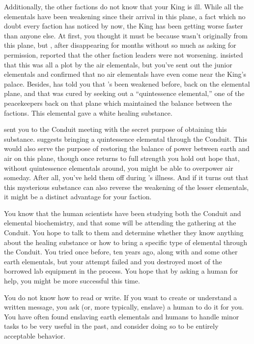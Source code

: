 \documentclass[char]{elementals}
\begin{document}
Additionally, the other factions do not know that your King is ill.  While all the elementals have been weakening since their arrival in this plane, a fact which no doubt every faction has noticed by now, the King has been getting worse faster than anyone else.  At first, you thought it must be because \cEarthKing{} wasn't originally from this plane, but \cRogue{}, after disappearing for months without so much as asking for permission, reported that the other faction leaders were not worsening.  \cRogue{\They} insisted that this was all a plot by the air elementals, but you've sent out the junior elementals and confirmed that no air elementals have even come near the King's palace.  Besides, \cEarthKing{} has told you that \cEarthKing{\they}'s been weakened before, back on the elemental plane, and that \cEarthKing{\they} was cured by seeking out a ``quintessence elemental,'' one of the peacekeepers back on that plane which maintained the balance between the factions.  This elemental gave \cEarthKing{\them} a white healing substance.  

\cEarthKing{} sent you to the Conduit meeting with the secret purpose of obtaining this substance.  \cEarthKing{\They} suggests bringing a quintessence elemental through the Conduit.  This would also serve the purpose of restoring the balance of power between earth and air on this plane, though once \cEarthKing{} returns to full strength you hold out hope that, without quintessence elementals around, you might be able to overpower air someday.  After all, you've held them off during \cEarthKing{}'s illness.  And if it turns out that this mysterious substance can also reverse the weakening of the lesser elementals, it might be a distinct advantage for your faction.

You know that the human scientists have been studying both the Conduit and elemental biochemistry, and that some will be attending the gathering at the Conduit.  You hope to talk to them and determine whether they know anything about the healing substance or how to bring a specific type of elemental through the Conduit.  You tried once before, ten years ago, along with \cMinion{\intro} and some other earth elementals, but your attempt failed and you destroyed most of the borrowed lab equipment in the  process.  You hope that by asking a human for help, you might be more successful this time.

You do not know how to read or write.  If you want to create or understand a written message, you ask (or, more typically, enslave) a human to do it for you.  You have often found enslaving earth elementals and humans to handle minor tasks to be very useful in the past, and consider doing so to be entirely acceptable behavior.
\end{document}
